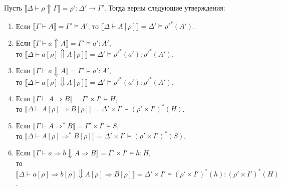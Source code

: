 \documentclass{amsart}
\theoremstyle{definition}
\theoremstyle{remark}
\newcommand{\red}{\Rightarrow}
\renewcommand{\ll}{\llbracket}
\newcommand{\rr}{\rrbracket}
\numberwithin{figure}{section}
\begin{document}
\begin{lem}
Пусть $\ll \Delta \vdash \rho \Uparrow \Gamma \rr = \rho' : \Delta' \to \Gamma'$.
Тогда верны следующие утверждения:
\begin{enumerate}
\item Если $\ll \Gamma \vdash A \rr = \Gamma' \models A'$, то $\ll \Delta \vdash A[\rho] \rr = \Delta' \models \rho'^*(A')$.
\item Если $\ll \Gamma \vdash a \Uparrow A \rr = \Gamma' \models a' : A'$, \\
    то $\ll \Delta \vdash a[\rho] \Uparrow A[\rho] \rr = \Delta' \models \rho'^*(a') : \rho'^*(A')$.
\item Если $\ll \Gamma \vdash a \Downarrow A \rr = \Gamma' \models a' : A'$, \\
    то $\ll \Delta \vdash a[\rho] \Downarrow A[\rho] \rr = \Delta' \models \rho'^*(a') : \rho'^*(A')$.
\item Если $\ll \Gamma \vdash A \red B \rr = \Gamma' \times I' \models H$, \\
    то $\ll \Delta \vdash A[\rho] \red B[\rho] \rr = \Delta' \times I' \models (\rho' \times I')^*(H)$.
\item Если $\ll \Gamma \vdash A \red^* B \rr = \Gamma' \times I' \models S$, \\
    то $\ll \Delta \vdash A[\rho] \red^* B[\rho] \rr = \Delta' \times I' \models (\rho' \times I')^*(S)$.
\item Если $\ll \Gamma \vdash a \red b \Downarrow A \red B \rr = \Gamma' \times I' \models h : H$, \\
    то $\ll \Delta \vdash a[\rho] \red b[\rho] \Downarrow A[\rho] \red B[\rho] \rr = \Delta' \times I' \models (\rho' \times I')^*(h) : (\rho' \times I')^*(H)$.
\end{enumerate}
\end{lem}
\end{document}
